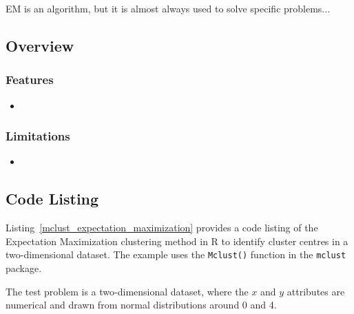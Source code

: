 EM is an algorithm, but it is almost always used to solve specific problems...

\subsection{Overview}

\subsubsection{Features}

\begin{itemize}
	\item 
\end{itemize}

\subsubsection{Limitations}

\begin{itemize}
	\item 
\end{itemize}


\subsection{Code Listing}
Listing~\ref{mclust_expectation_maximization} provides a code listing of the Expectation Maximization clustering method in R to identify cluster centres in a two-dimensional dataset.
The example uses the \texttt{Mclust()} function in the \texttt{mclust}  package.

The test problem is a two-dimensional dataset, where the $x$ and $y$ attributes are numerical and drawn from normal distributions around 0 and 4. 






